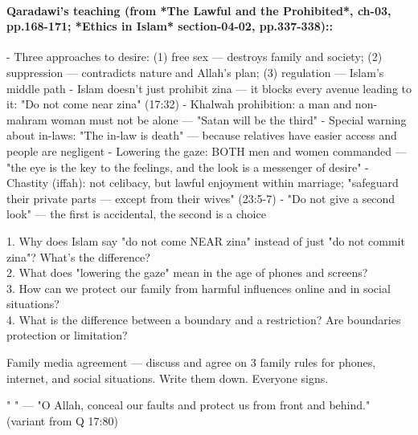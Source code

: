 \documentclass[11pt,a4paper]{article}
\begin{document}
\paragraph*{Qaradawi's teaching (from *The Lawful and the Prohibited*, ch-03, pp.168-171; *Ethics in Islam* section-04-02, pp.337-338)::}  - Three approaches to desire: (1) free sex --- destroys family and society; (2) suppression --- contradicts nature and Allah's plan; (3) regulation --- Islam's middle path - Islam doesn't just prohibit zina --- it blocks every avenue leading to it: "Do not come near zina" (17:32) - Khalwah prohibition: a man and non-mahram woman must not be alone --- "Satan will be the third" - Special warning about in-laws: "The in-law is death" --- because relatives have easier access and people are negligent - Lowering the gaze: BOTH men and women commanded --- "the eye is the key to the feelings, and the look is a messenger of desire" - Chastity (iffah): not celibacy, but lawful enjoyment within marriage; "safeguard their private parts --- except from their wives" (23:5-7) - "Do not give a second look" --- the first is accidental, the second is a choice

\begin{discussionbox} 1. Why does Islam say "do not come NEAR zina" instead of just "do not commit zina"? What's the difference? \\ 2. What does "lowering the gaze" mean in the age of phones and screens? \\ 3. How can we protect our family from harmful influences online and in social situations? \\ 4. What is the difference between a boundary and a restriction? Are boundaries protection or limitation? \end{discussionbox}

\begin{activitybox} Family media agreement --- discuss and agree on 3 family rules for phones, internet, and social situations. Write them down. Everyone signs. \end{activitybox}

\begin{duabox} "        " --- "O Allah, conceal our faults and protect us from front and behind." (variant from Q 17:80) \end{duabox}
\end{document}
